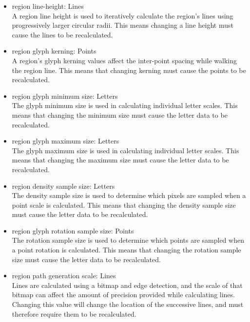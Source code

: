 \begin{itemize}
      \item region line-height: Lines \\
            A region line height is used to iteratively calculate the region's lines using progressively larger circular radii.
            This means changing a line height must cause the lines to be recalculated.

      \item region glyph kerning: Points \\
            A region's glyph kerning values affect the inter-point spacing while walking the region line.
            This means that changing kerning must cause the points to be recalculated.

      \item region glyph minimum size: Letters \\
            The glyph minimum size is used in calculating individual letter scales.
            This means that changing the minimum size must cause the letter data to be recalculated.

      \item region glyph maximum size: Letters \\
            The glyph maximum size is used in calculating individual letter scales.
            This means that changing the maximum size must cause the letter data to be recalculated.

      \item region density sample size: Letters \\
            The density sample size is used to determine which pixels are sampled when a point scale is calculated.
            This means that changing the density sample size must cause the letter data to be recalculated.

      \item region glyph rotation sample size: Points \\
            The rotation sample size is used to determine which points are sampled when a point rotation is calculated.
            This means that changing the rotation sample size must cause the letter data to be recalculated.

      \item region path generation scale: Lines \\
            Lines are calculated using a bitmap and edge detection, and the scale of that bitmap can affect the amount of precision provided while calculating lines.
            Changing this value will change the location of the successive lines, and must therefore require them to be recalculated.
\end{itemize}

